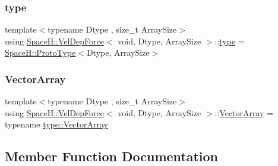 \subsubsection{\texorpdfstring{type}{type}}
{\footnotesize\ttfamily template$<$typename Dtype , size\+\_\+t Array\+Size$>$ \\
using \mbox{\hyperlink{struct_space_h_1_1_vel_dep_force}{Space\+H\+::\+Vel\+Dep\+Force}}$<$ void, Dtype, Array\+Size $>$\+::\mbox{\hyperlink{struct_space_h_1_1_vel_dep_force_3_01void_00_01_dtype_00_01_array_size_01_4_a8e214ae99bb3d88564c1161b660288b1}{type}} =  \mbox{\hyperlink{struct_space_h_1_1_proto_type}{Space\+H\+::\+Proto\+Type}}$<$Dtype, Array\+Size$>$}

\mbox{\label{struct_space_h_1_1_vel_dep_force_3_01void_00_01_dtype_00_01_array_size_01_4_ab9ab08040353afbaeeade8a442331b8d}} 
\subsubsection{\texorpdfstring{Vector\+Array}{VectorArray}}
{\footnotesize\ttfamily template$<$typename Dtype , size\+\_\+t Array\+Size$>$ \\
using \mbox{\hyperlink{struct_space_h_1_1_vel_dep_force}{Space\+H\+::\+Vel\+Dep\+Force}}$<$ void, Dtype, Array\+Size $>$\+::\mbox{\hyperlink{struct_space_h_1_1_vel_dep_force_3_01void_00_01_dtype_00_01_array_size_01_4_ab9ab08040353afbaeeade8a442331b8d}{Vector\+Array}} =  typename \mbox{\hyperlink{struct_space_h_1_1_proto_type_a622b8e122b33bb4966a02299fb7b82d6}{type\+::\+Vector\+Array}}}



\subsection{Member Function Documentation}
\mbox{\label{struct_space_h_1_1_vel_dep_force_3_01void_00_01_dtype_00_01_array_size_01_4_a6b744a37be68d4762676e026b5c0abc9}} 
